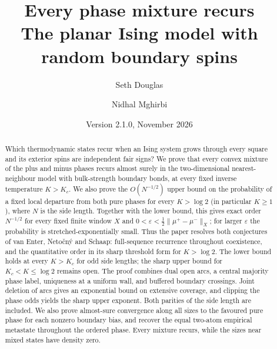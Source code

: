 \documentclass[11pt,a4paper]{article}
\title{Every phase mixture recurs\\The planar Ising model with random boundary spins}
\author{Seth Douglas \and Nidhal Mghirbi}
\date{Version 2.1.0, November 2026}
\theoremstyle{definition}
\theoremstyle{remark}
\numberwithin{equation}{section}
\newcommand{\eps}{\varepsilon}
\begin{document}
\maketitle
\begin{abstract}
Which thermodynamic states recur when an Ising system grows through every square and its exterior spins are independent fair signs? We prove that every convex mixture of the plus and minus phases recurs almost surely in the two-dimensional nearest-neighbour model with bulk-strength boundary bonds, at every fixed inverse temperature $K>K_c$. We also prove the $O(N^{-1/2})$ upper bound on the probability of a fixed local departure from both pure phases for every $K>\log2$ (in particular $K\ge1$), where $N$ is the side length. Together with the lower bound, this gives exact order $N^{-1/2}$ for every fixed finite window $X$ and $0<\eps<\tfrac12\|\mu^+-\mu^-\|_X$; for larger $\eps$ the probability is stretched-exponentially small. Thus the paper resolves both conjectures of van Enter, Neto\v cn\'y and Schaap: full-sequence recurrence throughout coexistence, and the quantitative order in its sharp threshold form for $K>\log2$. The lower bound holds at every $K>K_c$ for odd side lengths; the sharp upper bound for $K_c<K\le\log2$ remains open. The proof combines dual open arcs, a central majority phase label, uniqueness at a uniform wall, and buffered boundary crossings. Joint deletion of arcs gives an exponential bound on extensive coverage, and clipping the phase odds yields the sharp upper exponent. Both parities of the side length are included. We also prove almost-sure convergence along all sizes to the favoured pure phase for each nonzero boundary bias, and recover the equal two-atom empirical metastate throughout the ordered phase. Every mixture recurs, while the sizes near mixed states have density zero.
\end{abstract}
\begin{center}\end{center}
{\small\tableofcontents}










\appendix


\end{document}
